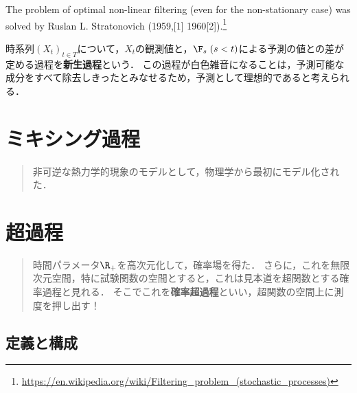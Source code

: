 \documentclass[uplatex,dvipdfmx]{jsreport}
\begin{document}
\begin{tcolorbox}[colframe=ForestGreen, colback=ForestGreen!10!white,breakable,colbacktitle=ForestGreen!40!white,coltitle=black,fonttitle=\bfseries\sffamily,
title=]
The problem of optimal non-linear filtering (even for the non-stationary case) was solved by Ruslan L. Stratonovich (1959,[1] 1960[2]).\footnote{\url{https://en.wikipedia.org/wiki/Filtering_problem_(stochastic_processes)}}
\end{tcolorbox}

\begin{definition}
    
\end{definition}

\begin{definition}[innovation]
    時系列$(X_t)_{t\in T}$について，$X_t$の観測値と，$\F_s\;(s<t)$による予測の値との差が定める過程を\textbf{新生過程}という．
    この過程が白色雑音になることは，予測可能な成分をすべて除去しきったとみなせるため，予測として理想的であると考えられる．
\end{definition}

\chapter{ミキシング過程}

\begin{quotation}
    非可逆な熱力学的現象のモデルとして，物理学から最初にモデル化された．
\end{quotation}

\chapter{超過程}

\begin{quotation}
    時間パラメータ$\R_+$を高次元化して，確率場を得た．
    さらに，これを無限次元空間，特に試験関数の空間とすると，これは見本道を超関数とする確率過程と見れる．
    そこでこれを\textbf{確率超過程}といい，超関数の空間上に測度を押し出す！
\end{quotation}

\section{定義と構成}
\end{document}
